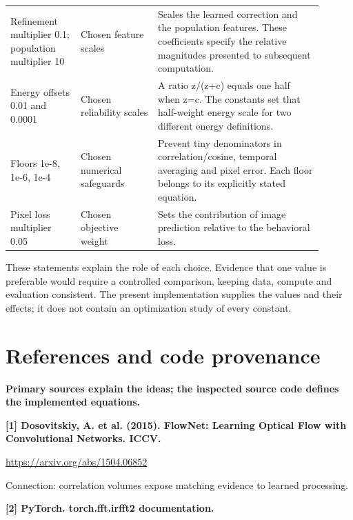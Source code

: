 \documentclass[11pt,letterpaper]{article}
\begin{document}
\begin{center}
\begin{tabular}{p{0.206\linewidth}p{0.224\linewidth}p{0.470\linewidth}}
Refinement multiplier 0.1; population multiplier 10 & Chosen feature scales & Scales the learned correction and the population features. These coefficients specify the relative magnitudes presented to subsequent computation. \\

Energy offsets 0.01 and 0.0001 & Chosen reliability scales & A ratio z/\allowbreak{}(z+c) equals one half when z=c. The constants set that half-weight energy scale for two different energy definitions. \\

Floors 1e-8, 1e-6, 1e-4 & Chosen numerical safeguards & Prevent tiny denominators in correlation/\allowbreak{}cosine, temporal averaging and pixel error. Each floor belongs to its explicitly stated equation. \\

Pixel loss multiplier 0.05 & Chosen objective weight & Sets the contribution of image prediction relative to the behavioral loss. \\

\bottomrule\end{tabular}\end{center}

These statements explain the role of each choice. Evidence that one value is preferable would require a controlled comparison, keeping data, compute and evaluation consistent. The present implementation supplies the values and their effects; it does not contain an optimization study of every constant.


\clearpage

\section{References and code provenance}\label{sec21}

\textbf{Primary sources explain the ideas; the inspected source code defines the implemented equations.}


\textbf{[1] Dosovitskiy, A. et al. (2015). FlowNet: Learning Optical Flow with Convolutional Networks. ICCV.}


{
\small\color{muted} \href{https://arxiv.org/abs/1504.06852}{https:/\allowbreak{}/\allowbreak{}arxiv.org/\allowbreak{}abs/\allowbreak{}1504.06852}\par Connection: correlation volumes expose matching evidence to learned processing.\par}


\textbf{[2] PyTorch. torch.fft.irfft2 documentation.}
\end{document}
